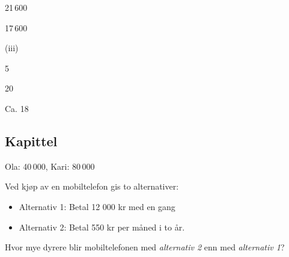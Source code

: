 
21\,600

 17\,600

 (iii)




 5

 20

 Ca. 18

\subsection*{Kapittel \label{LigningerAM1}}
 Ola: 40\,000, Kari: 80\,000 



 \vs
{}





Ved kjøp av en mobiltelefon gis to alternativer:
\begin{itemize}
	\item Alternativ 1: Betal 12 000 kr med en gang
	\item Alternativ 2: Betal 550 kr per måned i to år.
\end{itemize}
Hvor mye dyrere blir mobiltelefonen med \textsl{alternativ 2} enn med \textsl{alternativ 1}?

